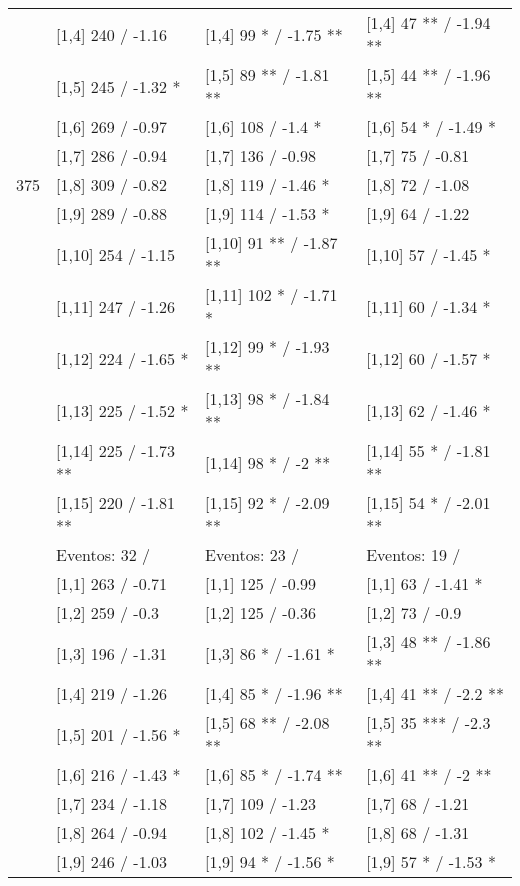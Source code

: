 \begin{table}
\begin{tabular}[t]{llll}
\addlinespace
 & {}[1,4] 240  / -1.16 & {}[1,4] 99 * / -1.75 ** & {}[1,4] 47 ** / -1.94 **\\
 & {}[1,5] 245  / -1.32 * & {}[1,5] 89 ** / -1.81 ** & {}[1,5] 44 ** / -1.96 **\\
 & {}[1,6] 269  / -0.97 & {}[1,6] 108  / -1.4 * & {}[1,6] 54 * / -1.49 *\\
 & {}[1,7] 286  / -0.94 & {}[1,7] 136  / -0.98 & {}[1,7] 75  / -0.81\\
375 & {}[1,8] 309  / -0.82 & {}[1,8] 119  / -1.46 * & {}[1,8] 72  / -1.08\\
\addlinespace
 & {}[1,9] 289  / -0.88 & {}[1,9] 114  / -1.53 * & {}[1,9] 64  / -1.22\\
 & {}[1,10] 254  / -1.15 & {}[1,10] 91 ** / -1.87 ** & {}[1,10] 57  / -1.45 *\\
 & {}[1,11] 247  / -1.26 & {}[1,11] 102 * / -1.71 * & {}[1,11] 60  / -1.34 *\\
 & {}[1,12] 224  / -1.65 * & {}[1,12] 99 * / -1.93 ** & {}[1,12] 60  / -1.57 *\\
 & {}[1,13] 225  / -1.52 * & {}[1,13] 98 * / -1.84 ** & {}[1,13] 62  / -1.46 *\\
\addlinespace
 & {}[1,14] 225  / -1.73 ** & {}[1,14] 98 * / -2 ** & {}[1,14] 55 * / -1.81 **\\
 & {}[1,15] 220  / -1.81 ** & {}[1,15] 92 * / -2.09 ** & {}[1,15] 54 * / -2.01 **\\
 & Eventos:  32 / & Eventos:  23 / & Eventos:  19 /\\
 & {}[1,1] 263  / -0.71 & {}[1,1] 125  / -0.99 & {}[1,1] 63  / -1.41 *\\
 & {}[1,2] 259  / -0.3 & {}[1,2] 125  / -0.36 & {}[1,2] 73  / -0.9\\
\addlinespace
 & {}[1,3] 196  / -1.31 & {}[1,3] 86 * / -1.61 * & {}[1,3] 48 ** / -1.86 **\\
 & {}[1,4] 219  / -1.26 & {}[1,4] 85 * / -1.96 ** & {}[1,4] 41 ** / -2.2 **\\
 & {}[1,5] 201  / -1.56 * & {}[1,5] 68 ** / -2.08 ** & {}[1,5] 35 *** / -2.3 **\\
 & {}[1,6] 216  / -1.43 * & {}[1,6] 85 * / -1.74 ** & {}[1,6] 41 ** / -2 **\\
 & {}[1,7] 234  / -1.18 & {}[1,7] 109  / -1.23 & {}[1,7] 68  / -1.21\\
\addlinespace
500 & {}[1,8] 264  / -0.94 & {}[1,8] 102  / -1.45 * & {}[1,8] 68  / -1.31\\
 & {}[1,9] 246  / -1.03 & {}[1,9] 94 * / -1.56 * & {}[1,9] 57 * / -1.53 *\\

\end{tabular}
\end{table}
